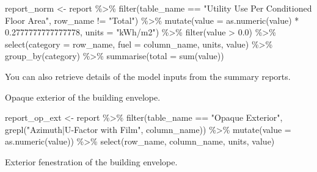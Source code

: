 \documentclass[
]{book}
\newenvironment{Shaded}{\begin{snugshade}}{\end{snugshade}}
\newcommand{\AttributeTok}[1]{\textcolor[rgb]{0.77,0.63,0.00}{#1}}
\newcommand{\FloatTok}[1]{\textcolor[rgb]{0.00,0.00,0.81}{#1}}
\newcommand{\FunctionTok}[1]{\textcolor[rgb]{0.00,0.00,0.00}{#1}}
\newcommand{\NormalTok}[1]{#1}
\newcommand{\OtherTok}[1]{\textcolor[rgb]{0.56,0.35,0.01}{#1}}
\newcommand{\SpecialCharTok}[1]{\textcolor[rgb]{0.00,0.00,0.00}{#1}}
\newcommand{\StringTok}[1]{\textcolor[rgb]{0.31,0.60,0.02}{#1}}
\begin{document}
\begin{Shaded}
\begin{Highlighting}[]
\NormalTok{report\_norm }\OtherTok{\textless{}{-}}\NormalTok{ report }\SpecialCharTok{\%\textgreater{}\%}
    \FunctionTok{filter}\NormalTok{(table\_name }\SpecialCharTok{==} \StringTok{"Utility Use Per Conditioned Floor Area"}\NormalTok{,}
\NormalTok{           row\_name }\SpecialCharTok{!=} \StringTok{"Total"}\NormalTok{) }\SpecialCharTok{\%\textgreater{}\%}
    \FunctionTok{mutate}\NormalTok{(}\AttributeTok{value =} \FunctionTok{as.numeric}\NormalTok{(value) }\SpecialCharTok{*} \FloatTok{0.2777777777777778}\NormalTok{,}
           \AttributeTok{units =} \StringTok{"kWh/m2"}\NormalTok{) }\SpecialCharTok{\%\textgreater{}\%}
    \FunctionTok{filter}\NormalTok{(value }\SpecialCharTok{\textgreater{}} \FloatTok{0.0}\NormalTok{) }\SpecialCharTok{\%\textgreater{}\%}
    \FunctionTok{select}\NormalTok{(}\AttributeTok{category =}\NormalTok{ row\_name, }\AttributeTok{fuel =}\NormalTok{ column\_name, units, value) }\SpecialCharTok{\%\textgreater{}\%}
    \FunctionTok{group\_by}\NormalTok{(category) }\SpecialCharTok{\%\textgreater{}\%}
    \FunctionTok{summarise}\NormalTok{(}\AttributeTok{total =} \FunctionTok{sum}\NormalTok{(value))}
\end{Highlighting}
\end{Shaded}

You can also retrieve details of the model inputs from the summary reports.

Opaque exterior of the building envelope.

\begin{Shaded}
\begin{Highlighting}[]
\NormalTok{report\_op\_ext }\OtherTok{\textless{}{-}}\NormalTok{ report }\SpecialCharTok{\%\textgreater{}\%}
    \FunctionTok{filter}\NormalTok{(table\_name }\SpecialCharTok{==} \StringTok{"Opaque Exterior"}\NormalTok{,}
           \FunctionTok{grepl}\NormalTok{(}\StringTok{"Azimuth|U{-}Factor with Film"}\NormalTok{, column\_name)) }\SpecialCharTok{\%\textgreater{}\%}
    \FunctionTok{mutate}\NormalTok{(}\AttributeTok{value =} \FunctionTok{as.numeric}\NormalTok{(value)) }\SpecialCharTok{\%\textgreater{}\%}
    \FunctionTok{select}\NormalTok{(row\_name, column\_name, units, value) }
\end{Highlighting}
\end{Shaded}

Exterior fenestration of the building envelope.
\end{document}
